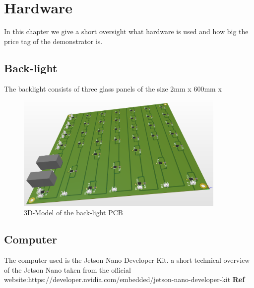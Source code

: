 \newpage
\section{Hardware}
In this chapter we give a short oversight what hardware is used and how big the price tag of the demonstrator is. 

\subsection{Back-light}
The backlight consists of three glass panels of the size 2mm x 600mm x 
\begin{figure}[ht]
	\centering
	\includegraphics[width=0.9\textwidth]{3-development/images/Backlight.png}
	\caption{3D-Model of the back-light PCB\label{development:pcb}}
\end{figure} 

\subsection{Computer}
The computer used is the Jetson Nano Developer Kit. a short technical overview of the Jetson Nano taken from the official website:https://developer.nvidia.com/embedded/jetson-nano-developer-kit \textbf{Ref}\\

